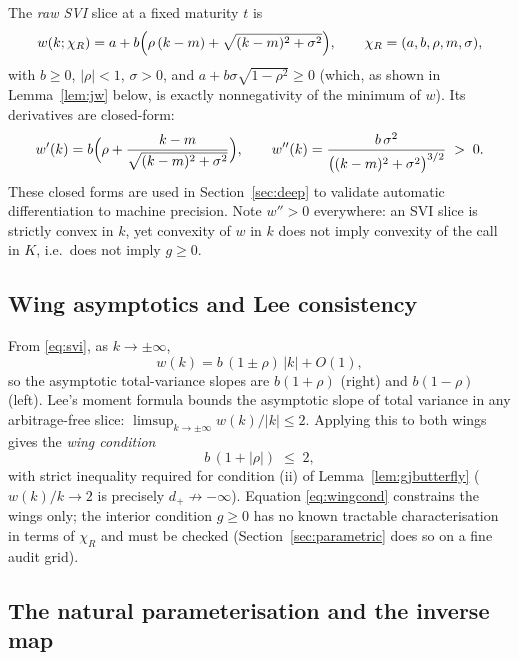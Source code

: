 The \emph{raw SVI} slice \cite{gatheral2004} at a fixed maturity $t$ is
\begin{equation}\label{eq:svi}
w(k;\chi_R)=a+b\Bigl(\rho\,(k-m)+\sqrt{(k-m)^2+\sigma^2}\Bigr),
\qquad \chi_R=(a,b,\rho,m,\sigma),
\end{equation}
with $b\ge0$, $|\rho|<1$, $\sigma>0$, and $a+b\sigma\sqrt{1-\rho^2}\ge0$ (which, as shown in
Lemma~\ref{lem:jw} below, is exactly nonnegativity of the minimum of $w$). Its derivatives are
closed-form:
\begin{equation}\label{eq:svideriv}
w'(k)=b\Bigl(\rho+\frac{k-m}{\sqrt{(k-m)^2+\sigma^2}}\Bigr),\qquad
w''(k)=\frac{b\,\sigma^2}{\bigl((k-m)^2+\sigma^2\bigr)^{3/2}}\;>\;0 .
\end{equation}
These closed forms are used in Section~\ref{sec:deep} to validate automatic differentiation to
machine precision. Note $w''>0$ everywhere: an SVI slice is strictly convex in $k$, yet
convexity of $w$ in $k$ does not imply convexity of the call in $K$, i.e.\ does not imply
$g\ge0$.

\subsection{Wing asymptotics and Lee consistency}

From \eqref{eq:svi}, as $k\to\pm\infty$,
\begin{equation}\label{eq:sviwings}
w(k)=b\,(1\pm\rho)\,|k|+O(1),
\end{equation}
so the asymptotic total-variance slopes are $b(1+\rho)$ (right) and $b(1-\rho)$ (left). Lee's
moment formula \cite{lee2004} bounds the asymptotic slope of total variance in any
arbitrage-free slice: $\limsup_{k\to\pm\infty} w(k)/|k|\le 2$. Applying this to both wings gives
the \emph{wing condition}
\begin{equation}\label{eq:wingcond}
b\,(1+|\rho|)\;\le\;2 ,
\end{equation}
with strict inequality required for condition (ii) of Lemma~\ref{lem:gjbutterfly}
($w(k)/k\to2$ is precisely $d_+\not\to-\infty$). Equation \eqref{eq:wingcond} constrains the
wings only; the interior condition $g\ge0$ has no known tractable characterisation in terms of
$\chi_R$ and must be checked (Section~\ref{sec:parametric} does so on a fine audit grid).

\subsection{The natural parameterisation and the inverse map}

